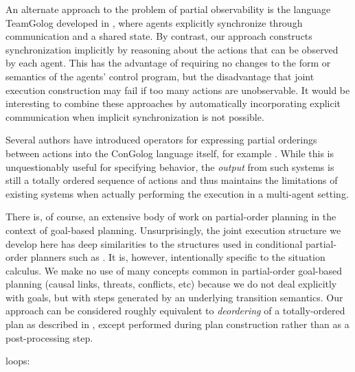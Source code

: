 An alternate approach to the problem of partial observability is the
language TeamGolog developed in \citep{farinelli07team_golog}, where
agents explicitly synchronize through communication and a shared state.
By contrast, our approach constructs synchronization implicitly by
reasoning about the actions that can be observed by each agent. This
has the advantage of requiring no changes to the form or semantics
of the agents' control program, but the disadvantage that joint execution
construction may fail if too many actions are unobservable. It would
be interesting to combine these approaches by automatically incorporating
explicit communication when implicit synchronization is not possible.

Several authors have introduced operators for expressing partial orderings
between actions into the ConGolog language itself, for example \citep{son00htn_golog}.
While this is unquestionably useful for specifying behavior, the \emph{output}
from such systems is still a totally ordered sequence of actions and
thus maintains the limitations of existing systems when actually performing
the execution in a multi-agent setting.

There is, of course, an extensive body of work on partial-order planning
in the context of goal-based planning. Unsurprisingly, the joint execution
structure we develop here has deep similarities to the structures
used in conditional partial-order planners such as \citep{peot92conditional_nonlinear}.
It is, however, intentionally specific to the situation calculus.
We make no use of many concepts common in partial-order goal-based
planning (causal links, threats, conflicts, etc) because we do not
deal explicitly with goals, but with steps generated by an underlying
transition semantics. Our approach can be considered roughly equivalent
to \emph{deordering} of a totally-ordered plan as described in \citep{backstrom99reordering},
except performed during plan construction rather than as a post-processing
step.

loops: \citep{levesque96what_is_planning,levesque05planning_with_loops}

